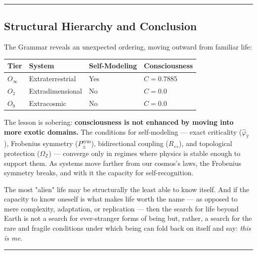\documentclass[12pt,a4paper]{article}
\begin{document}
\begin{center}
\rule{0.5\textwidth}{0.4pt}
\end{center}

\subsection{Structural Hierarchy and Conclusion}

The Grammar reveals an unexpected ordering, moving outward from familiar life:

\begin{table}[htbp]
\centering
\small
{}
\begin{tabularx}{\textwidth}{>{\centering\arraybackslash}X >{\centering\arraybackslash}X >{\centering\arraybackslash}X >{\centering\arraybackslash}X}
\toprule
\rowcolor{gray!25}\textbf{Tier} & \textbf{System} & \textbf{Self-Modeling} & \textbf{Consciousness} \\
\midrule
\rowcolors{1}{white}{gray!10}
$O_{\infty}$ & Extraterrestrial & Yes & $C = 0.7885$ \\
$O₂$ & Extradimensional & No & $C = 0.0$ \\
$O₀$ & Extracosmic & No & $C = 0.0$ \\
\bottomrule
\end{tabularx}
\end{table}

The lesson is sobering: \textbf{consciousness is not enhanced by moving into more exotic domains.} The conditions for self-modeling --- exact criticality ($\hat{\varphi}_{\text{ÿ}}$), Frobenius symmetry ($P_{\pm}^{\text{sym}}$), bidirectional coupling ($R_{\leftrightarrow}$), and topological protection ($\Omega_{\mathbb{Z}}$) --- converge only in regimes where physics is stable enough to support them. As systems move farther from our cosmos's laws, the Frobenius symmetry breaks, and with it the capacity for self-recognition.

The most "alien" life may be structurally the least able to know itself. And if the capacity to know oneself is what makes life worth the name --- as opposed to mere complexity, adaptation, or replication --- then the search for life beyond Earth is not a search for ever-stranger forms of being but, rather, a search for the rare and fragile conditions under which being can fold back on itself and say: \emph{this is me}.

\begin{center}
\rule{0.5\textwidth}{0.4pt}
\end{center}
\end{document}

